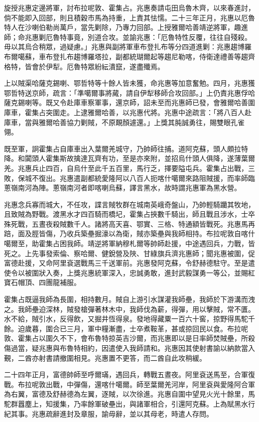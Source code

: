 \begin{pinyinscope}
旋授兆惠定邊將軍，討布拉呢敦、霍集占。兆惠奏請屯田烏魯木齊，以來春進討，倘不能即入回部，則且積穀市馬為持重，上責其怯懦。二十三年正月，兆惠以厄魯特人在沙喇伯勒尚萬戶，當先剿除，乃專力回部。上授雅爾哈善靖逆將軍，趣進師；命兆惠剿厄魯特事竟，別道合攻。並諭兆惠：「厄魯特性反覆，往往自殘殺。毋以其烏合稍眾，過疑慮。」兆惠與副將軍車布登扎布等分四道進剿：兆惠趨博羅布爾噶蘇，車布登扎布趨博羅塔拉，副都統瑚爾起等趨尼勒喀，侍衛達禮善等趨齊格特，皆會於伊犁。厄魯特眾紛紜潰竄，遂盡殲焉。

上以賊渠哈薩克錫喇、鄂哲特等十餘人皆未獲，命兆惠等加意奮勉。四月，兆惠獲鄂哲特送京師，疏言：「準噶爾事將蕆，請自伊犁移師合攻回部。」上仍責兆惠俘哈薩克錫喇等。既又令赴庫車察軍事，還京師，詔未至而兆惠師已發，會雅爾哈善圍庫車，霍集占突圍走。上逮雅爾哈善，以兆惠代將。兆惠中途疏言：「將八百人赴庫車，當與雅爾哈善協力剿賊，不原靦顏遽還。」上獎其肫誠勇往，賜雙眼孔雀翎。

既至軍，詗霍集占自庫車出入葉爾羌城守，乃帥師往捕。道阿克蘇，頭人頗拉特降。和闐頭人霍集斯故擒達瓦齊有功，至是亦來附，並招烏什頭人俱降，遂薄葉爾羌。兆惠兵止四百，自烏什至此千五百里，馬行乏，擇要隘屯兵。霍集占出戰，三敗，保城不復出。兆惠遣副都統愛隆阿以八百人扼喀什噶爾來路阻賊援，而率師臨蔥嶺南河為陣。蔥嶺南河者即喀喇烏蘇，譯言黑水，故時謂兆惠軍為黑水營。

兆惠念兵寡而城大，不任攻，諜言賊牧群在城南英峨奇盤山，乃帥輕騎躪其牧地，且致賊為野戰。渡黑水才四百騎而橋圮，霍集占挾數千騎出，師且戰且涉水，士卒殊死戰，五晝夜殺賊數千人。諸將高天喜、鄂實、三格、特通額皆戰死。兆惠馬再踣，面及脛皆傷，乃收兵築壘掘濠以為衛，賊亦築壘與我師相持。布拉呢敦自喀什噶爾至，助霍集占困我師。靖逆將軍納穆札爾等帥師赴援，中途遇回兵，力戰，皆死之。上先事發索倫、察哈爾、健銳營及陜、甘綠旗兵濟兆惠師；聞兆惠被圍，促富德赴援，又命阿里袞選戰馬三千送軍前。兆惠發阿克蘇，令舒赫德駐守。至是遣使令以被圍狀入奏，上獎兆惠統軍深入，忠誠勇敢，進封武毅謀勇一等公，並賜紅寶石帽頂、四團龍補服。

霍集占既逼我師為長圍，相持數月。賊自上游引水謀灌我師壘，我師於下游溝而洩之。我師壘迫深林，賊發槍彈著林木中，我師伐為薪，得彈，用以擊賊，常不匱。水不給，賊引水，反得飲，又掘井恆得泉。發地得藏粟一百六十窖，掠野得馬駝千餘。迫歲暮，圍合已三月，軍中糧漸盡，士卒煮鞍革，甚或掠回民以食。布拉呢敦、霍集占以圍久不下，會布魯特掠英吉沙爾，而兆惠即以是日率師焚賊壘，所殺傷過當，疑兆惠與布魯特相約，因遣使入我師請和。兆惠因其使射書諭以納款當入覲，二酋亦射書請撤圍相見。兆惠置不更答，而二酋自此攻稍緩。

二十四年正月，富德帥師至呼爾璊，遇回兵，轉戰五晝夜。阿里袞送馬至，合軍復戰。布拉呢敦出戰，中彈傷，還喀什噶爾。師至葉爾羌河岸，阿里袞與愛隆阿合軍為右翼，富德及舒赫德為左翼，逐賊，以次徐進。兆惠自圍中望見火光十餘里，馬駝群囂塵上，知援集，乃率餘軍破壘出，與諸軍相合，引還阿克蘇。上為賦黑水行紀其事。兆惠疏辭進封及章服，諭毋辭，並以其母老，時遣人存問。


\end{pinyinscope}

